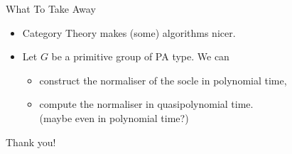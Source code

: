 \begin{frame}{What To Take Away}
    \begin{itemize}
        \setlength\itemsep{2em}
        \item
        Category Theory makes (some) algorithms nicer.
        \pause
        \item
        Let $G$ be a primitive group of PA type. We can
        \pause
        \begin{itemize}
            \item
            construct the normaliser of the socle in polynomial time,
            \pause
            \item
            compute the normaliser in quasipolynomial time.
            \\
            \pause
            (maybe even in polynomial time?)
        \end{itemize}
    \end{itemize}
\end{frame}

\begin{frame}
    \centering
    \Large
    Thank you!
\end{frame}
